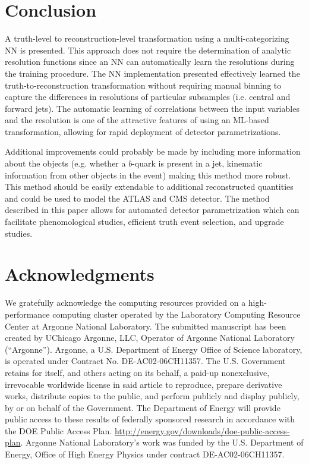 \documentclass[showpacs,showkeys,preprint,prd,nofootinbib,linenumbers,12pt,superscriptaddress]{revtex4-1}
\begin{document}
\section{Conclusion}
A truth-level to reconstruction-level transformation using a multi-categorizing NN is presented. This approach does not require the determination of analytic resolution functions since an NN can automatically learn the resolutions during the training procedure. The NN implementation presented effectively learned the truth-to-reconstruction transformation without requiring manual binning to capture the differences in resolutions of particular subsamples (i.e. central and forward jets). The automatic learning of correlations between the input variables and the resolution is one of the attractive features of using an ML-based transformation, allowing for rapid deployment of detector parametrizations.

Additional improvements could probably be made by including more information about the objects (e.g. whether a $b$-quark is present in a jet, kinematic information from other objects in the event) making this method more robust. This method should be easily extendable to additional reconstructed quantities and could be used to model the ATLAS and CMS detector. The method described in this paper allows for automated detector parametrization which can facilitate phenomological studies, efficient truth event selection, and upgrade studies.

\section*{Acknowledgments}
We gratefully acknowledge the computing resources provided on a
high-performance computing cluster operated by the
Laboratory Computing Resource Center at Argonne National Laboratory.
The submitted manuscript has been created by UChicago Argonne, LLC,
Operator of Argonne National Laboratory (“Argonne”). Argonne, a U.S.
Department of Energy Office of Science laboratory, is operated under
Contract No. DE-AC02-06CH11357. The U.S. Government retains for itself,
and others acting on its behalf, a paid-up nonexclusive, irrevocable
worldwide license in said article to reproduce, prepare derivative works,
distribute copies to the public, and perform publicly and display
publicly, by or on behalf of the Government.
The Department of Energy will provide public access to these results of
federally sponsored research in accordance with the
DOE Public Access Plan.
\url{http://energy.gov/downloads/doe-public-access-plan}. Argonne
National Laboratory’s work was
funded by the U.S. Department of Energy, Office of High Energy Physics
under contract DE-AC02-06CH11357.


\end{document}
